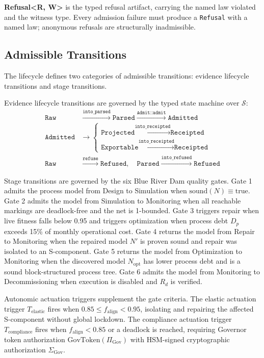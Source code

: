 \textbf{Refusal\textless R, W\textgreater} is the typed refusal artifact, carrying the
named law violated and the witness type. Every admission failure must produce a
\texttt{Refusal} with a named law; anonymous refusals are structurally inadmissible.

\subsection{Admissible Transitions}
\label{sec:lifecycle-architecture-transitions}

The lifecycle defines two categories of admissible transitions: evidence lifecycle
transitions and stage transitions.

Evidence lifecycle transitions are governed by the typed state machine over $\mathcal{S}$:
\begin{align*}
\texttt{Raw} &\xrightarrow{\texttt{into\_parsed}} \texttt{Parsed}
  \xrightarrow{\texttt{Admit::admit}} \texttt{Admitted} \\
\texttt{Admitted} &\to
  \begin{cases}
    \texttt{Projected} \xrightarrow{\texttt{into\_receipted}} \texttt{Receipted} \\
    \texttt{Exportable} \xrightarrow{\texttt{into\_receipted}} \texttt{Receipted}
  \end{cases} \\
\texttt{Raw} &\xrightarrow{\texttt{refuse}} \texttt{Refused}, \quad
\texttt{Parsed} \xrightarrow{\texttt{into\_refused}} \texttt{Refused}
\end{align*}

Stage transitions are governed by the six Blue River Dam quality gates. Gate 1 admits
the process model from Design to Simulation when $\mathrm{sound}(N) \equiv \mathrm{true}$.
Gate 2 admits the model from Simulation to Monitoring when all reachable markings are
deadlock-free and the net is 1-bounded. Gate 3 triggers repair when live fitness falls
below 0.95 and triggers optimization when process debt $D_p$ exceeds 15\% of monthly
operational cost. Gate 4 returns the model from Repair to Monitoring when the repaired
model $N'$ is proven sound and repair was isolated to an S-component. Gate 5 returns the
model from Optimization to Monitoring when the discovered model $N_{\mathrm{opt}}$ has
lower process debt and is a sound block-structured process tree. Gate 6 admits the model
from Monitoring to Decommissioning when execution is disabled and $R_d$ is verified.

Autonomic actuation triggers supplement the gate criteria. The elastic actuation trigger
$T_{\mathrm{elastic}}$ fires when $0.85 \leq f_{\mathrm{align}} < 0.95$, isolating and
repairing the affected S-component without global lockdown. The compliance actuation
trigger $T_{\mathrm{compliance}}$ fires when $f_{\mathrm{align}} < 0.85$ or a deadlock
is reached, requiring Governor token authorization $\mathrm{GovToken}(\Pi_{\mathrm{Gov}})$
with HSM-signed cryptographic authorization $\Sigma_{\mathrm{Gov}}$.

